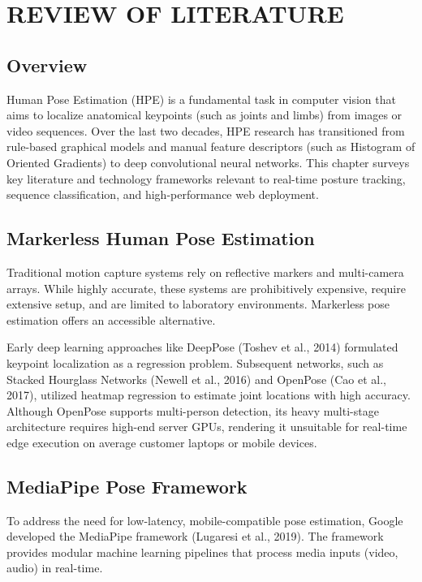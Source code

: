\chapter{REVIEW OF LITERATURE}

\section{Overview}
Human Pose Estimation (HPE) is a fundamental task in computer vision that aims to localize anatomical keypoints (such as joints and limbs) from images or video sequences. Over the last two decades, HPE research has transitioned from rule-based graphical models and manual feature descriptors (such as Histogram of Oriented Gradients) to deep convolutional neural networks. This chapter surveys key literature and technology frameworks relevant to real-time posture tracking, sequence classification, and high-performance web deployment.

\section{Markerless Human Pose Estimation}
Traditional motion capture systems rely on reflective markers and multi-camera arrays. While highly accurate, these systems are prohibitively expensive, require extensive setup, and are limited to laboratory environments. Markerless pose estimation offers an accessible alternative. 

Early deep learning approaches like DeepPose (Toshev et al., 2014) formulated keypoint localization as a regression problem. Subsequent networks, such as Stacked Hourglass Networks (Newell et al., 2016) and OpenPose (Cao et al., 2017), utilized heatmap regression to estimate joint locations with high accuracy. Although OpenPose supports multi-person detection, its heavy multi-stage architecture requires high-end server GPUs, rendering it unsuitable for real-time edge execution on average customer laptops or mobile devices.

\section{MediaPipe Pose Framework}
To address the need for low-latency, mobile-compatible pose estimation, Google developed the MediaPipe framework (Lugaresi et al., 2019). The framework provides modular machine learning pipelines that process media inputs (video, audio) in real-time.

